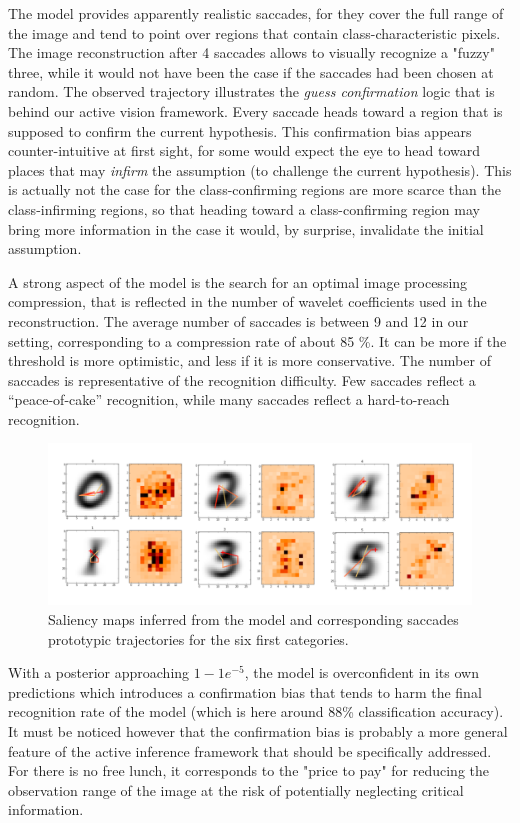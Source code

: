 \documentclass{article} %
\begin{document}
The model provides apparently realistic saccades, for they cover the full range of the image and tend to point over regions that contain class-characteristic pixels. The image reconstruction after 4 saccades allows to visually recognize a "fuzzy" three, while it would not have been the case if the saccades had been chosen at random.
The observed trajectory illustrates the \emph{guess confirmation} logic that is behind our active vision framework. Every saccade heads toward a region that is supposed to confirm the current hypothesis. This confirmation bias appears counter-intuitive at first sight, for some would expect the eye to head toward places that may \emph{infirm} the assumption (to challenge the current hypothesis). This is actually not the case for the class-confirming regions are more scarce than the class-infirming regions, so that heading toward a class-confirming region may bring more information in the case it would, by surprise, invalidate the initial assumption.

A strong aspect of the model is the search for an optimal image processing compression, that is reflected in the number of wavelet coefficients used in the reconstruction. The average number of saccades is between 9 and 12 in our setting, corresponding to a compression rate of about 85 \%. It can be more if the threshold is more optimistic, and less if it is more conservative. The number of saccades is representative of the recognition difficulty. Few saccades reflect a ``peace-of-cake'' recognition, while many saccades reflect a hard-to-reach recognition.  

\begin{figure}[t!]
	\centerline{
		\includegraphics[width = \linewidth]{img/ICLR-saliency-maps.png} 
	}
	\caption{Saliency maps inferred from the model and corresponding saccades prototypic trajectories for the six first categories.}\label{fig:saliency-maps}
\end{figure}

With a posterior approaching $1 - 1e^{-5}$, the model is overconfident in its own predictions which introduces a confirmation bias that tends to harm the final recognition rate of the model (which is here around 88\% classification accuracy). It must be noticed however that the confirmation bias is probably a more general feature of the active inference framework that should be specifically addressed. For there is no free lunch, it corresponds to the "price to pay" for reducing the observation range of the image at the risk of potentially neglecting critical information. 
\end{document}
